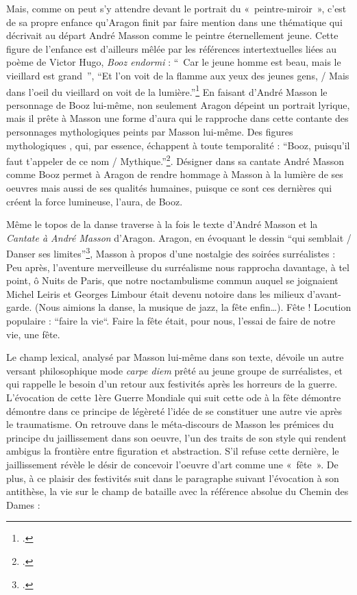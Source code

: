 	 Mais, comme on peut s’y attendre devant le portrait du « peintre-miroir », c’est de sa propre enfance qu’Aragon finit par faire mention dans une thématique qui décrivait au départ André Masson comme le peintre éternellement jeune. Cette figure de l’enfance est d’ailleurs mêlée par les références intertextuelles liées au  poème de Victor Hugo, \emph{Booz endormi }: \enquote{ Car le jeune homme est beau, mais le vieillard est grand }, \enquote{Et l'on voit de la flamme aux yeux des jeunes gens, / Mais dans l’oeil du vieillard on voit de la lumière.}\footcite{hugo} En faisant d’André Masson le personnage de Booz lui-même, non seulement Aragon dépeint un portrait lyrique, mais il prête à Masson une forme d’aura qui le rapproche dans cette contante des personnages mythologiques peints par Masson lui-même. Des figures mythologiques , qui, par essence, échappent à toute temporalité :  \enquote{Booz, puisqu'il faut t’appeler de ce nom / Mythique.}\footcite[p685]{ecritssurla}. Désigner dans sa cantate André Masson comme Booz permet à Aragon de rendre hommage à Masson à la lumière de ses oeuvres mais aussi de ses qualités humaines, puisque ce sont ces dernières qui créent la force lumineuse, l’aura, de Booz. 

	Même le topos de la danse traverse à la fois le texte d’André Masson et la \emph{Cantate à André Masson }d’Aragon. Aragon, en évoquant le dessin \enquote{qui semblait / Danser ses limites}\footcite[p682]{ecritssurla}, Masson à propos d’une nostalgie des soirées surréalistes : 
 Peu après, l’aventure merveilleuse du surréalisme nous rapprocha davantage, à tel point, ô Nuits de Paris, que notre noctambulisme commun auquel se joignaient Michel Leiris et Georges Limbour était devenu notoire dans les milieux d’avant-garde. (Nous aimions la danse, la musique de jazz, la fête enfin…). Fête ! Locution populaire : “faire la vie“. Faire la fête était, pour nous, l’essai de faire de notre vie, une fête. 

	Le champ lexical, analysé par Masson lui-même dans son texte, dévoile un autre versant philosophique mode \emph{carpe diem} prêté au jeune groupe de surréalistes, et qui rappelle le besoin d’un retour aux festivités après les horreurs de la guerre. L’évocation de cette 1ère Guerre Mondiale qui suit cette ode à la fête démontre démontre dans ce principe de légèreté l’idée de se constituer une autre vie après le traumatisme. On retrouve dans le méta-discours de Masson les prémices du principe du jaillissement dans son oeuvre, l’un des traits de son style qui rendent ambigus la frontière entre figuration et abstraction. S’il refuse cette dernière, le jaillissement révèle le désir de concevoir l’oeuvre d’art comme une « fête ». De plus, à ce plaisir des festivités suit dans le paragraphe suivant l’évocation à son antithèse, la vie sur le champ de bataille avec la référence absolue du Chemin des Dames : 


